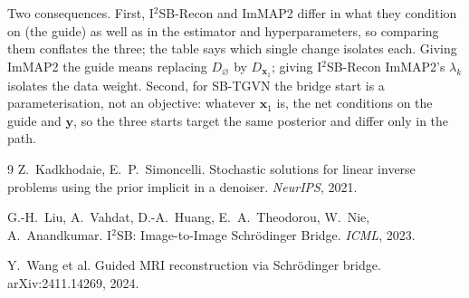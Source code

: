 \documentclass[11pt]{article}
\theoremstyle{remark}
\newcommand{\x}{\bm{x}}
\newcommand{\y}{\bm{y}}
\newcommand{\Dz}{D_{\varnothing}}
\newcommand{\Dg}{D_{\x_1}}
\begin{document}
Two consequences. First, I$^2$SB-Recon and ImMAP2 differ in what they condition on (the guide)
as well as in the estimator and hyperparameters, so comparing them conflates the three; the
table says which single change isolates each. Giving ImMAP2 the guide means replacing $\Dz$ by
$\Dg$; giving I$^2$SB-Recon ImMAP2's $\lambda_k$ isolates the data weight. Second, for SB-TGVN the
bridge start is a parameterisation, not an objective: whatever $\x_1$ is, the net conditions on
the guide and $\y$, so the three starts target the same posterior and differ only in the path.

\begin{thebibliography}{9}
Z.~Kadkhodaie, E.~P.~Simoncelli. Stochastic solutions for linear inverse problems using the
prior implicit in a denoiser. \emph{NeurIPS}, 2021.

G.-H.~Liu, A.~Vahdat, D.-A.~Huang, E.~A.~Theodorou, W.~Nie, A.~Anandkumar.
I$^2$SB: Image-to-Image Schr\"odinger Bridge. \emph{ICML}, 2023.

Y.~Wang et al. Guided MRI reconstruction via Schr\"odinger bridge. arXiv:2411.14269, 2024.
\end{thebibliography}
\end{document}
